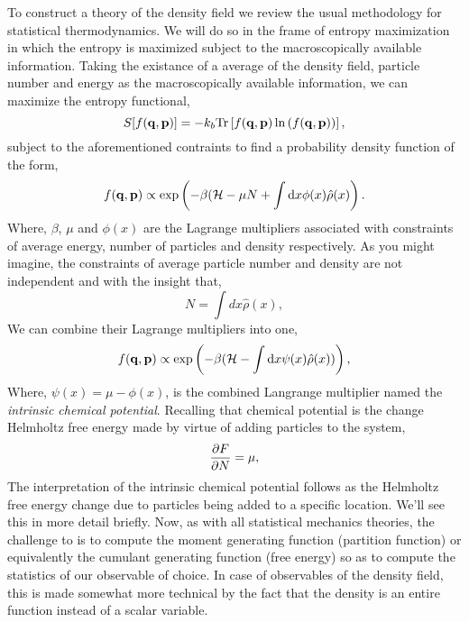To construct a theory of the density field we review the usual methodology for
statistical thermodynamics. We will do so in the frame of entropy maximization
in which the entropy is maximized subject to the macroscopically available
information. Taking the existance of a average of the density field, particle
number and energy as the macroscopically available information, we can maximize
the entropy functional,
%
\begin{equation}
    S[f(\mathbf{q}, \mathbf{p})] = -k_b \mathrm{Tr}\left[ f(\mathbf{q}, \mathbf{p})\ln\left(f(\mathbf{q}, \mathbf{p})\right) \right], 
\end{equation}
%
subject to the aforementioned contraints to find a probability density function
of the form,
%
\begin{equation} 
    f(\mathbf{q}, \mathbf{p}) \propto \exp\left(-\beta(\mathcal{H} -\mu N + \int \mathrm{d}x
        \phi(x)\hat{\rho}(x)\right).
\end{equation}
%
Where, $\beta$, $\mu$ and $\phi(x)$ are the Lagrange multipliers associated
with constraints of average energy, number of particles and density
respectively. As you might imagine, the constraints of average particle number
and density are not independent and with the insight that,
%
\begin{equation}
    N = \int dx \hat{\rho}(x),
\end{equation}
%
We can combine their Lagrange multipliers into one,
%
\begin{equation}
    f(\mathbf{q}, \mathbf{p}) \propto \exp\left(- \beta(\mathcal{H} - \int \mathrm{d}x \psi(x)
        \hat{\rho}(x))\right),
\end{equation}
%
Where, $\psi(x) = \mu - \phi(x)$, is the combined Langrange multiplier named
the \textit{intrinsic chemical potential}. Recalling that chemical potential is
the change Helmholtz free energy made by virtue of adding particles to the
system,
%
\begin{equation}
    \frac{\partial F}{\partial N} = \mu,
\end{equation}
%
The interpretation of the intrinsic chemical potential follows as the Helmholtz
free energy change due to particles being added to a specific location.  We'll
see this in more detail briefly.  Now, as with all statistical mechanics
theories, the challenge to is to compute the moment generating function
(partition function) or equivalently the cumulant generating function (free
energy) so as to compute the statistics of our observable of choice.  In case
of observables of the density field, this is made somewhat more technical by
the fact that the density is an entire function instead of a scalar variable.
